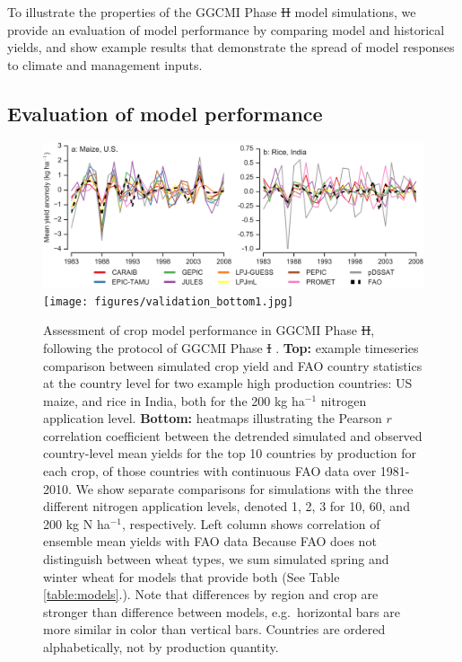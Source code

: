 \documentclass[gmd, manuscript]{copernicus} %
\providecommand{\DIFadd}[1]{{\protect\color{blue}\uwave{#1}}} %
\providecommand{\DIFdel}[1]{{\protect\color{red}\sout{#1}}}                      %
\providecommand{\DIFaddbegin}{} %
\providecommand{\DIFaddend}{} %
\providecommand{\DIFdelbegin}{} %
\providecommand{\DIFdelend}{} %
\providecommand{\DIFaddFL}[1]{\DIFadd{#1}} %
\providecommand{\DIFdelFL}[1]{\DIFdel{#1}} %
\providecommand{\DIFaddbeginFL}{} %
\providecommand{\DIFaddendFL}{} %
\providecommand{\DIFdelbeginFL}{} %
\providecommand{\DIFdelendFL}{} %
\begin{document}
To illustrate the properties of the GGCMI Phase \DIFdelbegin \DIFdel{II }\DIFdelend \DIFaddbegin \DIFadd{2 }\DIFaddend model simulations, we provide an evaluation of model performance by comparing model and historical yields, and show example results that demonstrate the spread of model responses to climate and management inputs. 

\subsection{Evaluation of model performance}
\begin{figure}[ht]
  \centering
  \includegraphics[width=14.5cm]{figures/validation_top.png}
  \texttt{[image: figures/validation\_bottom1.jpg]}
  \caption{
  Assessment of crop model performance in GGCMI Phase \DIFdelbeginFL \DIFdelFL{II}\DIFdelendFL \DIFaddbeginFL \DIFaddFL{2}\DIFaddendFL , following the protocol of GGCMI Phase \DIFdelbeginFL \DIFdelFL{I }\DIFdelendFL \DIFaddbeginFL \DIFaddFL{1 }\DIFaddendFL \citep{muller_global_2017}. 
  \textbf{Top:} example timeseries comparison between simulated crop yield and FAO country statistics \citep{FAOSTAT} at the country level for two example high production countries: US maize, and rice in India, both for the 200 kg ha$^{-1}$ nitrogen application level. 
  \textbf{Bottom:} heatmaps illustrating the Pearson $r$ correlation coefficient between the detrended simulated and observed country-level mean yields for the top 10 countries by production for each crop, of those countries with continuous FAO data over 1981-2010.
  We show separate comparisons for simulations with the three different nitrogen application levels, denoted 1, 2, 3 for 10, 60, and 200 kg N ha$^{-1}$, respectively. 
  Left column shows correlation of ensemble mean yields with FAO data 
  Because FAO does not distinguish between wheat types, we sum simulated spring and winter wheat for models that provide both (See Table \ref{table:models}.). 
  Note that differences by region and crop are stronger than difference between models, e.g.\ horizontal bars are more similar in color than vertical bars.
  Countries are ordered alphabetically, not by production quantity.
  }
  \label{fig:simulation_val}
\end{figure}
\end{document}
